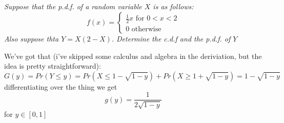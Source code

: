 \documentclass[11pt,oneside,titlepage]{book}
\begin{document}
\subsection{}

\textit{Suppose that the p.d.f. of a random variable $X$ is as follows:}
$$f(x) =
\begin{cases}
  \frac{1}{2} x \text{ for } 0 < x < 2 \\
  0 \text{ otherwise}
\end{cases}
$$
\textit{Also suppose thta $Y = X(2 - X)$. Determine the c.d.f and the p.d.f. of
  $Y$}

We've got that (i've skipped some calculus and algebra in the deriviation,
but the idea is pretty straightforward):
$$G(y) = Pr(Y \leq y) = Pr(X \leq 1 - \sqrt{1 - y}) + Pr(X \geq 1 + \sqrt{1 - y}) =
1 - \sqrt{1 - y}$$
differentiating over the thing we get
$$g(y) = \frac{1}{2\sqrt{1 - y}}$$
for $y \in [0, 1]$
\end{document}
